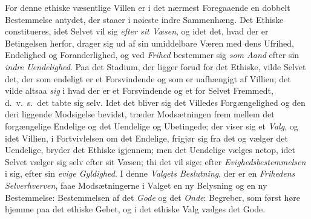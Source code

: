 For denne ethiske væsentlige Villen er i det nærmest Foregaaende en dobbelt
Bestemmelse antydet, der staaer i nøieste indre Sammenhæng. Det Ethiske
constitueres, idet Selvet vil sig \emph{efter sit Væsen}, og idet det, hvad der
er Betingelsen herfor, drager sig ud af sin umiddelbare Væren med dens Ufrihed,
Endelighed og Foranderlighed, og ved \emph{Frihed} bestemmer sig \emph{som Aand}
efter sin \emph{indre Uendelighed}. Paa det Stadium, der ligger forud for det
Ethiske, vilde Selvet det, der som endeligt er et Forsvindende og som er
uafhængigt af Villien; det vilde altsaa \emph{sig} i hvad der er et Forsvindende
og et for Selvet Fremmedt, d.\ v.\ s.\ det tabte sig selv. Idet det bliver sig
det Villedes Forgængelighed og den deri liggende Modsigelse bevidst, træder
Modsætningen frem mellem det forgængelige Endelige og det Uendelige og
Ubetingede; der viser sig et \emph{Valg}, og idet Villien, i Fortvivlelsen om
det Endelige, frigjør sig fra det og vælger det Uendelige, bryder det Ethiske
igjennem; men det Uendelige vælges netop, idet Selvet vælger sig selv efter sit
Væsen; thi det vil sige: efter \emph{Evighedsbestemmelsen} i sig, efter sin
\emph{evige Gyldighed}. I denne \emph{Valgets Beslutning}, der er en
\emph{Frihedens Selverhverven}, faae Modsætningerne i Valget en ny Belysning og
en ny
 \setcounter{footnote}{0}%
Bestemmelse: Bestemmelsen af det \emph{Gode} og det \emph{Onde}: Begreber, som
først høre hjemme paa det ethiske Gebet, og i det ethiske Valg vælges det Gode.

